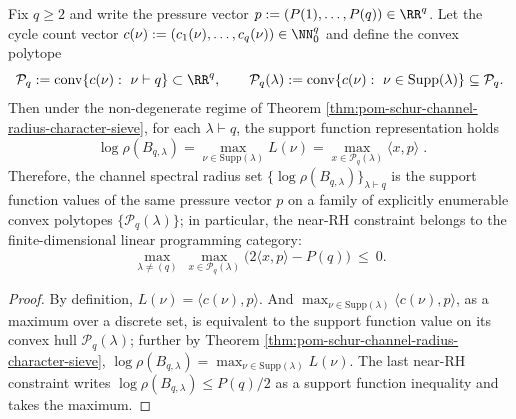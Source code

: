 \begin{corollary}\label{cor:pom-schur-pressure-polytope-shell}
Fix \(q\ge2\) and write the pressure vector \(p:=(P(1),\dots,P(q))\in\RR^q\).
Let the cycle count vector
\(
c(\nu):=(c_1(\nu),\dots,c_q(\nu))\in\NN_0^q
\)
and define the convex polytope
\[
\mathcal{P}_q:=\mathrm{conv}\{c(\nu):\ \nu\vdash q\}\subset\RR^q,
\qquad
\mathcal{P}_q(\lambda):=\mathrm{conv}\{c(\nu):\ \nu\in\mathrm{Supp}(\lambda)\}\subseteq\mathcal{P}_q.
\]
Then under the non-degenerate regime of Theorem \ref{thm:pom-schur-channel-radius-character-sieve}, for each \(\lambda\vdash q\), the support function representation holds
\[
\boxed{\;
\log\rho(B_{q,\lambda})
=
\max_{\nu\in\mathrm{Supp}(\lambda)}L(\nu)
=
\max_{x\in\mathcal{P}_q(\lambda)}\langle x,p\rangle\; }.
\]
Therefore, the channel spectral radius set
\(\{\log\rho(B_{q,\lambda})\}_{\lambda\vdash q}\)
is the support function values of the same pressure vector \(p\) on a family of explicitly enumerable convex polytopes \(\{\mathcal{P}_q(\lambda)\}\);
in particular, the near-RH constraint belongs to the finite-dimensional linear programming category:
\[
\max_{\lambda\neq(q)}\ \max_{x\in\mathcal{P}_q(\lambda)}\bigl(2\langle x,p\rangle-P(q)\bigr)\ \le\ 0.
\]
\end{corollary}
\begin{proof}
By definition, \(L(\nu)=\langle c(\nu),p\rangle\).
And \(\max_{\nu\in\mathrm{Supp}(\lambda)}\langle c(\nu),p\rangle\), as a maximum over a discrete set, is equivalent to the support function value on its convex hull \(\mathcal{P}_q(\lambda)\);
further by Theorem \ref{thm:pom-schur-channel-radius-character-sieve}, \(\log\rho(B_{q,\lambda})=\max_{\nu\in\mathrm{Supp}(\lambda)}L(\nu)\).
The last near-RH constraint writes \(\log\rho(B_{q,\lambda})\le P(q)/2\) as a support function inequality and takes the maximum.
\end{proof}


